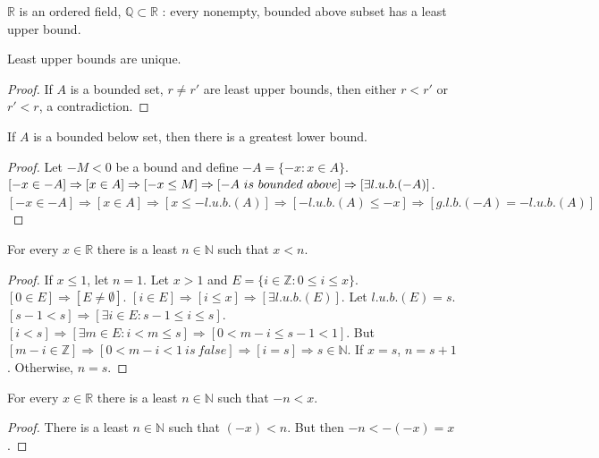 \documentclass[crop=false,class=book,oneside]{standalone}
\begin{document}
            \begin{definition}
            $\mathbb{R}$ is an ordered field, $\mathbb{Q}\subset \mathbb{R}$ : every nonempty, bounded above subset has a least upper bound.
            \end{definition}
            \begin{theorem}
            Least upper bounds are unique.
            \end{theorem}
            \begin{proof}
            If $A$ is a bounded set, $r\ne r'$ are least upper bounds, then either $r<r'$ or $r'<r$, a contradiction.
            \end{proof}
            \begin{theorem}
            If $A$ is a bounded below set, then there is a greatest lower bound.
            \end{theorem}
            \begin{proof}
            Let $-M<0$ be a bound and define $-A = \{-x: x\in A\}$. $[-x\in -A]\Rightarrow [x\in A]\Rightarrow [-x\leq M]\Rightarrow [-A\ is\ bounded\ above]\\ \Rightarrow [\exists l.u.b.(-A)]$. $[-x\in -A]\Rightarrow [x\in A]\Rightarrow [x\leq -l.u.b.(A)]\Rightarrow [-l.u.b.(A)\leq -x]\Rightarrow [g.l.b.(-A)=-l.u.b.(A)]$
            \end{proof}
            \begin{theorem}
            For every $x\in \mathbb{R}$ there is a least $n\in \mathbb{N}$ such that $x<n$. 
            \end{theorem}
            \begin{proof}
            If $x\leq1$, let $n=1$. Let $x>1$ and $E=\{i \in \mathbb{Z}: 0 \leq i \leq x\}$. $[0\in E]\Rightarrow [E\ne \emptyset]$. $[i\in E]\Rightarrow [i\leq x]\Rightarrow [\exists l.u.b.(E)]$. Let $l.u.b.(E)=s$. $[s-1<s]\Rightarrow [\exists i \in E:s-1 \leq i \leq s]$. $[i< s]\Rightarrow[\exists m\in E: i < m \leq s]\Rightarrow [0 < m-i \leq s-1 < 1]$. But $[m-i \in \mathbb{Z}]\Rightarrow [0<m-i<1\ is\ false]\Rightarrow [i = s]\Rightarrow s\in \mathbb{N}$. If $x=s$, $n = s+1$. Otherwise, $n=s$.
            \end{proof}
            \begin{corollary}
            For every $x\in \mathbb{R}$ there is a least $n\in \mathbb{N}$ such that $-n<x$.
            \end{corollary}
            \begin{proof}
            There is a least $n\in \mathbb{N}$ such that $(-x)<n$. But then $-n <-(-x) = x$. 
            \end{proof}
\end{document}
